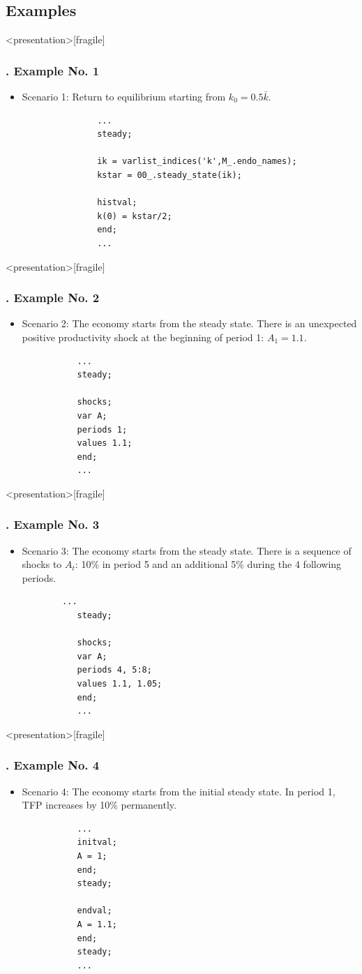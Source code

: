\documentclass[11pt,aspectratio=169]{beamer}
\begin{document}
\subsection{Examples}
\begin{frame}<presentation>[fragile]
	\frametitle{{\thesection.\thesubsection} Example No. 1}
	\begin{itemize}
		\item Scenario 1: Return to equilibrium starting from $k_0=0.5\bar{k}$.
			\begin{verbatim}
			   ...
			   steady;
			   
			   ik = varlist_indices('k',M_.endo_names);
			   kstar = 00_.steady_state(ik);
			   
			   histval;
			   k(0) = kstar/2;
			   end;
			   ...
			\end{verbatim}
	\end{itemize}
\end{frame}
\begin{frame}<presentation>[fragile]
	\frametitle{{\thesection.\thesubsection} Example No. 2}
	\begin{itemize}
		\item Scenario 2: The economy starts from the steady state. There is an unexpected positive productivity shock at the beginning of period 1: $A_1 = 1.1$.
		\begin{verbatim}
		   ...
		   steady;
		
		   shocks;
		   var A;
		   periods 1;
		   values 1.1;
		   end;
		   ...
		\end{verbatim}
	\end{itemize}
\end{frame}
\begin{frame}<presentation>[fragile]
	\frametitle{{\thesection.\thesubsection} Example No. 3}
	\begin{itemize}
		\justifying
		\item Scenario 3: The economy starts from the steady state. There is a sequence of shocks to $A_t$: 10\% in period 5 and an additional 5\% during the 4 following periods.
		\begin{verbatim}
	  	...
		   steady;
		
		   shocks;
		   var A;
		   periods 4, 5:8;
		   values 1.1, 1.05;
		   end;
		   ...
		\end{verbatim}
	\end{itemize}
\end{frame}
\begin{frame}<presentation>[fragile]
	\frametitle{{\thesection.\thesubsection} Example No. 4}
	\begin{itemize}
		\item Scenario 4: The economy starts from the initial steady state. In period 1, TFP increases by 10\% permanently.
		\begin{verbatim}
		   ...
		   initval;
		   A = 1;
		   end; 
		   steady;
		
		   endval;
		   A = 1.1;
		   end;
		   steady;
		   ...
		\end{verbatim}
	\end{itemize}
\end{frame}
\end{document}

